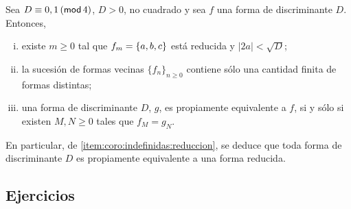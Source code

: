 \begin{coroIndefinidas}\label{coro:indefinidas}
	Sea $D\equiv 0,1\tmodulo[4]$, $D>0$, no cuadrado y sea $f$ una
	forma de discriminante $D$. Entonces,
	\begin{enumerate}[(i)]
		\item\label{item:coro:indefinidas:reduccion}
			existe $m\geq 0$ tal que $f_m=\binaria{a,b,c}$
			est\'a reducida y $|2a|<\sqrt D$;
		\item\label{item:coro:indefinidas:orbita}
			la sucesi\'on de formas vecinas $\{f_n\}_{n\geq 0}$
			contiene s\'olo una cantidad finita de formas
			distintas;
		\item\label{item:coro:indefinidas:comparacion}
			una forma de discriminante $D$, $g$, es propiamente
			equivalente a $f$, si y s\'olo si existen
			$M,N\geq 0$ tales que $f_M=g_N$.
	\end{enumerate}
	En particular, de \eqref{item:coro:indefinidas:reduccion},
	se deduce que toda forma de discriminante $D$ es propiamente
	equivalente a una forma reducida.
\end{coroIndefinidas}

\subsection*{Ejercicios}


